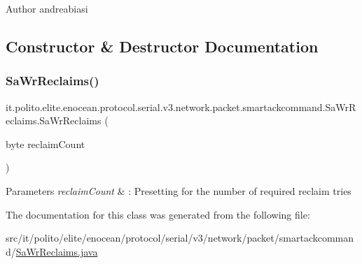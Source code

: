 \begin{DoxyAuthor}{Author}
andreabiasi 
\end{DoxyAuthor}


\subsection{Constructor \& Destructor Documentation}
\hypertarget{classit_1_1polito_1_1elite_1_1enocean_1_1protocol_1_1serial_1_1v3_1_1network_1_1packet_1_1smartackcommand_1_1_sa_wr_reclaims_a276fad35e07fe4075a5fac13ff0312f3}{}\label{classit_1_1polito_1_1elite_1_1enocean_1_1protocol_1_1serial_1_1v3_1_1network_1_1packet_1_1smartackcommand_1_1_sa_wr_reclaims_a276fad35e07fe4075a5fac13ff0312f3} 
\subsubsection{\texorpdfstring{Sa\+Wr\+Reclaims()}{SaWrReclaims()}}
{\footnotesize\ttfamily it.\+polito.\+elite.\+enocean.\+protocol.\+serial.\+v3.\+network.\+packet.\+smartackcommand.\+Sa\+Wr\+Reclaims.\+Sa\+Wr\+Reclaims (\begin{DoxyParamCaption}\item[{byte}]{reclaim\+Count }\end{DoxyParamCaption})}


\begin{DoxyParams}{Parameters}
{\em reclaim\+Count} & \+: Presetting for the number of required reclaim tries \\
\hline
\end{DoxyParams}


The documentation for this class was generated from the following file\+:\begin{DoxyCompactItemize}
\item 
src/it/polito/elite/enocean/protocol/serial/v3/network/packet/smartackcommand/\hyperlink{_sa_wr_reclaims_8java}{Sa\+Wr\+Reclaims.\+java}\end{DoxyCompactItemize}
